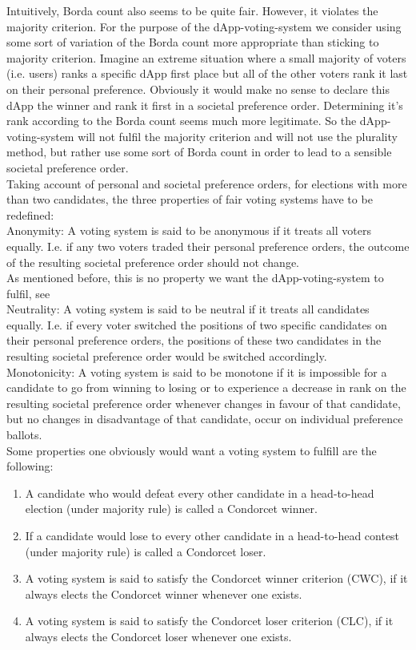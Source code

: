 Intuitively, Borda count also seems to be quite fair. However, it violates the majority criterion. For the purpose of the dApp-voting-system we consider using some sort of variation of the Borda count more appropriate than sticking to majority criterion. Imagine an extreme situation where a small majority of voters (i.e. users) ranks a specific dApp first place but all of the other voters rank it last on their personal preference. Obviously it would make no sense to declare this dApp the winner and rank it first in a societal preference order. Determining it's rank according to the Borda count seems much more legitimate. So the dApp-voting-system will not fulfil the majority criterion and will not use the plurality method, but rather use some sort of Borda count in order to lead to a sensible societal preference order. \\
Taking account of personal and societal preference orders, for elections with more than two candidates, the three properties of fair voting systems have to be redefined: \\
Anonymity: A voting system is said to be anonymous if it treats all voters equally. I.e. if any two voters traded their personal preference orders, the outcome of the resulting societal preference order should not change. \\
As mentioned before, this is no property we want the dApp-voting-system to fulfil, see \\ %
Neutrality: A voting system is said to be neutral if it treats all candidates equally. I.e. if every voter switched the positions of two specific candidates on their personal preference orders, the positions of these two candidates in the resulting societal preference order would be switched accordingly. \\
Monotonicity: A voting system is said to be monotone if it is impossible for a candidate to go from winning to losing or to experience a decrease in rank on the resulting societal preference order whenever changes in favour of that candidate, but no changes in disadvantage of that candidate, occur on individual preference ballots. \\
Some properties one obviously would want a voting system to fulfill are the following: \\
\begin{enumerate}
\item A candidate who would defeat every other candidate in a head-to-head election (under majority rule) is called a Condorcet winner. 
\item If a candidate would lose to every other candidate in a head-to-head contest (under majority rule) is called a Condorcet loser. 
\item A voting system is said to satisfy the Condorcet winner criterion (CWC), if it always elects the Condorcet winner whenever one exists.
\item A voting system is said to satisfy the Condorcet loser criterion (CLC), if it always elects the Condorcet loser whenever one exists. 
\end{enumerate}
